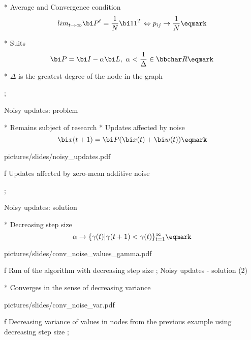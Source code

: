 * Average and Convergence condition \nl $$ lim_{t\rightarrow\infty} {\bi P}^t = {1\over N}{\bi 1 1}^T \Leftrightarrow  p_{ij} \rightarrow {1\over N} \eqmark $$

* Suits $${\bi P} = {\bi I} - \alpha {\bi L}, \ \alpha < {{1}\over{\Delta}} \in \bbchar R \eqmark $$
\begitems
* $\Delta$ is the greatest degree of the node in the graph
\enditems

\pg;


\sec Noisy updates: problem

* Remains subject of research
* Updates affected by noise  $$ {\bi x}(t+1) = {\bi P} ({\bi x}(t)+{\bi w}(t)) \eqmark$$


\centerline{\hsize \inspic pictures/slides/noisy_updates.pdf } 
\caption/f Updates affected by zero-mean additive noise


\pg;



\sec Noisy updates: solution


* Decreasing step size \nl $$\alpha \rightarrow \{ \gamma(t) | \gamma(t+1)<\gamma(t)  \}_{t=1}^\infty \eqmark$$


\centerline{\picw=14cm \inspic pictures/slides/conv_noise_values_gamma.pdf } 
\caption/f Run of the algorithm with decreasing step size
\pg;
\sec Noisy updates - solution (2)


* Converges in the sense of decreasing variance

\centerline{\picw=14cm \inspic pictures/slides/conv_noise_var.pdf } 
\caption/f Decreasing variance of values in nodes from the previous example using decreasing step size
\pg;







